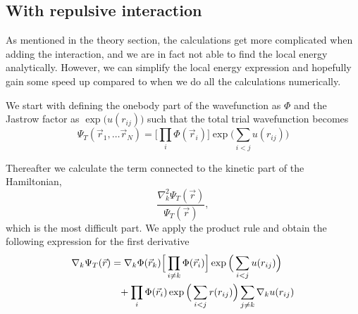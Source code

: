 \documentclass[norsk,a4paper,12pt]{article}
\begin{document}
\subsection{With repulsive interaction}
As mentioned in the theory section, the calculations get more complicated when adding the interaction, and we are in fact not able to find the local energy analytically. However, we can simplify the local energy expression and hopefully gain some speed up compared to when we do all the calculations numerically. 

We start with defining the onebody part of the wavefunction as $\Phi$ and the Jastrow factor as $\exp\big(u(r_{ij})\big)$ such that the total trial wavefunction becomes
\begin{equation}
\Psi_T(\vec{r}_1,\hdots\vec{r}_N)=\Big[\prod_i\Phi(\vec{r}_i)\Big]\exp\Big(\sum_{i<j}u(r_{ij})\Big)
\end{equation}

Thereafter we calculate the term connected to the kinetic part of the Hamiltonian,
\begin{equation}
\frac{\nabla_k^2\Psi_T(\vec{r})}{\Psi_T(\vec{r})},
\label{eq:ham_kin}
\end{equation}
which is the most difficult part. We apply the product rule and obtain the following expression for the first derivative
\begin{align}
\nabla_k\Psi_T(\vec{r})&=\nabla_k\Phi(\vec{r}_k)\Big[\prod_{i\neq k}\Phi(\vec{r}_i)\Big]\exp\Big(\sum_{i<j}u(r_{ij})\Big)\notag\\
&\phantom{=}+\prod_i\Phi(\vec{r}_i)\exp\Big(\sum_{i<j}r(r_{ij})\Big)
\sum_{j\neq k}\nabla_k u(r_{ij})
\end{align}
\end{document}
